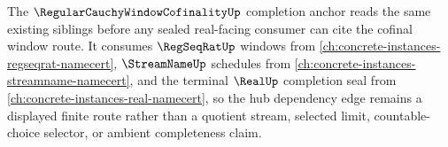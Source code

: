The $\RegularCauchyWindowCofinalityUp$ completion anchor reads the same existing siblings before any sealed real-facing consumer can cite the cofinal window route. It consumes $\RegSeqRatUp$ windows from \autoref{ch:concrete-instances-regseqrat-namecert}, $\StreamNameUp$ schedules from \autoref{ch:concrete-instances-streamname-namecert}, and the terminal $\RealUp$ completion seal from \autoref{ch:concrete-instances-real-namecert}, so the hub dependency edge remains a displayed finite route rather than a quotient stream, selected limit, countable-choice selector, or ambient completeness claim.
